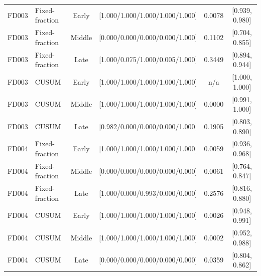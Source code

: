 \begin{table}[t]
\begin{tabular}{llcccc}
FD003 & Fixed-fraction & Early & [1.000/1.000/1.000/1.000/1.000] & 0.0078 & [0.939, 0.980] \\
FD003 & Fixed-fraction & Middle & [0.000/0.000/0.000/0.000/1.000] & 0.1102 & [0.704, 0.855] \\
FD003 & Fixed-fraction & Late & [1.000/0.075/1.000/0.005/1.000] & 0.3449 & [0.894, 0.944] \\
FD003 & CUSUM & Early & [1.000/1.000/1.000/1.000/1.000] & n/a & [1.000, 1.000] \\
FD003 & CUSUM & Middle & [1.000/1.000/1.000/1.000/1.000] & 0.0000 & [0.991, 1.000] \\
FD003 & CUSUM & Late & [0.982/0.000/0.000/0.000/1.000] & 0.1905 & [0.803, 0.890] \\
FD004 & Fixed-fraction & Early & [1.000/1.000/1.000/1.000/1.000] & 0.0059 & [0.936, 0.968] \\
FD004 & Fixed-fraction & Middle & [0.000/0.000/0.000/0.000/0.000] & 0.0061 & [0.764, 0.847] \\
FD004 & Fixed-fraction & Late & [1.000/0.000/0.993/0.000/0.000] & 0.2576 & [0.816, 0.880] \\
FD004 & CUSUM & Early & [1.000/1.000/1.000/1.000/1.000] & 0.0026 & [0.948, 0.991] \\
FD004 & CUSUM & Middle & [1.000/1.000/1.000/1.000/1.000] & 0.0002 & [0.952, 0.988] \\
FD004 & CUSUM & Late & [0.000/0.000/0.000/0.000/0.000] & 0.0359 & [0.804, 0.862] \\
\bottomrule
\end{tabular}
\end{table}
